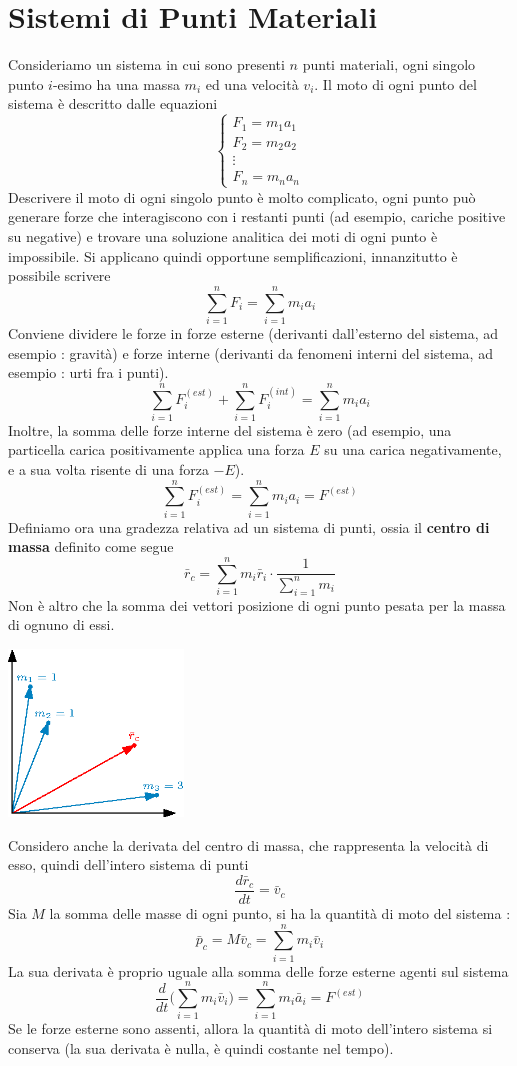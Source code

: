 \documentclass[10pt, letterpaper]{report}
\begin{document}
\section{Sistemi di Punti Materiali}
Consideriamo un sistema in cui sono presenti $n$ punti materiali, ogni singolo punto 
$i$-esimo ha una massa $m_i$ ed una velocità $v_i$. Il moto di ogni 
punto del sistema è descritto dalle equazioni 
$$ \begin{cases}
    F_1 = m_1a_1\\ 
    F_2 = m_2a_2\\ 
    \vdots \\
    F_n = m_na_n
\end{cases}$$
Descrivere il moto di ogni singolo punto è 
molto complicato, ogni punto può generare forze che interagiscono con 
i restanti punti (ad esempio, cariche positive su negative) e 
trovare una soluzione analitica dei moti di ogni punto è impossibile.
Si applicano quindi opportune semplificazioni, innanzitutto è possibile 
scrivere 
$$ \sum_{i=1}^n F_i = \sum_{i=1}^n m_ia_i$$
Conviene dividere le forze in forze esterne (derivanti dall'esterno del 
sistema, ad esempio : gravità) e forze interne (derivanti da fenomeni 
interni del sistema, ad esempio : urti fra i punti).
$$ \sum_{i=1}^n F_i^{(est)} +  \sum_{i=1}^n F_i^{(int)}  = \sum_{i=1}^n m_ia_i$$
Inoltre, la somma delle forze interne del sistema è zero (ad esempio, una particella carica 
positivamente applica una forza $E$ su una carica negativamente, e a sua volta 
risente di una forza $-E$).
$$ \sum_{i=1}^n F_i^{(est)}  = \sum_{i=1}^n m_ia_i = F^{(est)}$$
Definiamo ora una gradezza relativa ad un sistema di punti, 
ossia il \textbf{centro di massa} definito come segue 
$$ \bar r_c= 
 \sum_{i=1}^n m_i\bar r_i \cdot \frac{1}{\sum_{i=1}^n m_i}$$
Non è altro che la somma dei vettori posizione di ogni punto pesata per la massa 
di ognuno di essi.
\begin{center}
    \includegraphics[width=0.35\textwidth ]{images/centrodimassa.eps}
\end{center}
Considero anche la derivata del centro di massa, che rappresenta 
la velocità di esso, quindi dell'intero sistema di punti 
$$ \frac{d\bar r_c}{dt}=\bar v_c$$
Sia $M$ la somma delle masse di ogni punto, si ha la 
quantità di moto del sistema : 
$$ \bar p_c = M\bar v_c = \sum_{i=1}^n m_i\bar v_i $$
La sua derivata è proprio uguale alla somma delle forze esterne agenti sul 
sistema 
$$ \frac{d}{dt}\Big(\sum_{i=1}^n m_i\bar v_i \Big)=\sum_{i=1}^n m_i\bar a_i = F^{(est)} $$
Se le forze esterne sono assenti, allora la quantità di moto dell'intero sistema 
si conserva (la sua derivata è nulla, è quindi costante nel tempo). 
\end{document}

